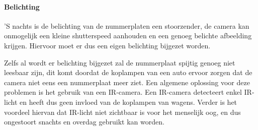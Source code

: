\paragraph{Belichting}
'S nachts is de belichting van de nummerplaten een stoorzender, de camera kan onmogelijk een kleine shutterspeed aanhouden en een genoeg belichte afbeelding krijgen. Hiervoor moet er dus een eigen belichting bijgezet worden.

Zelfs al wordt er belichting bijgezet zal de nummerplaat spijtig genoeg niet leesbaar zijn, dit komt doordat de koplampen van een auto ervoor zorgen dat de camera niet eens een nummerplaat meer ziet. Een algemene oplossing voor deze problemen is het gebruik van een IR-camera. Een IR-camera detecteert enkel IR-licht en heeft dus geen invloed van de koplampen van wagens. Verder is het voordeel hiervan dat IR-licht niet zichtbaar is voor het menselijk oog, en dus ongestoort snachts en overdag gebruikt kan worden.


